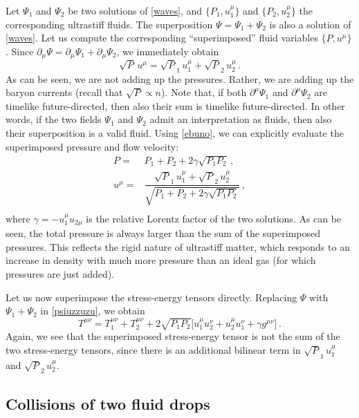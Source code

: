 \documentclass[a4paper, amsfonts, amssymb, amsmath, reprint, showkeys, nofootinbib, twoside,notitlepage,onecolumn]{revtex4-2}
\theoremstyle{definition}
\theoremstyle{theorem}
\theoremstyle{corollary}
\begin{document}
Let $\Psi_1$ and $\Psi_2$ be two solutions of \eqref{waves}, and $\{P_1,u^\mu_1 \}$ and $\{P_2,u^\mu_2 \}$ the corresponding ultrastiff fluids. The superposition $\Psi=\Psi_1+\Psi_2$ is also a solution of \eqref{waves}. Let us compute the corresponding ``superimposed'' fluid variables $\{P,u^\mu \}$. Since $\partial_\mu \Psi=\partial_\mu \Psi_1+\partial_\mu \Psi_2$, we immediately obtain
\begin{equation}\label{ebuno}
    \sqrt{P} \, u^\mu = \sqrt{P}_1 \, u_1^\mu +\sqrt{P}_2 \, u_2^\mu \, .
\end{equation}
As can be seen, we are not adding up the pressures. Rather, we are adding up the baryon currents (recall that $\sqrt{P}\propto n$). Note that, if both $\partial^\mu \Psi_1$ and $\partial^\mu \Psi_2$ are timelike future-directed, then also their sum is timelike future-directed. In other words, if the two fields $\Psi_1$ and $\Psi_2$ admit an interpretation as fluids, then also their superposition is a valid fluid. Using \eqref{ebuno}, we can explicitly evaluate the superimposed pressure and flow velocity:
\begin{equation}\label{orso}
\begin{split}
P ={}& P_1+P_2 +2\gamma \sqrt{P_1 P_2} \, , \\
u^\mu={}& \dfrac{\sqrt{P}_1 \, u_1^\mu +\sqrt{P}_2 \, u_2^\mu}{\sqrt{P_1+P_2 +2\gamma \sqrt{P_1 P_2}}} \, , \\
\end{split}
\end{equation}
where $\gamma=-u^\mu_1 u_{2\mu}$ is the relative Lorentz factor of the two solutions. As can be seen, the total pressure is always larger than the sum of the superimposed pressures. This reflects the rigid nature of ultrastiff matter, which responds to an increase in density with much more pressure than an ideal gas (for which pressures are just added).

Let us now superimpose the stress-energy tensors directly. Replacing $\Psi$ with $\Psi_1+\Psi_2$ in \eqref{psiuzzuzu}, we obtain
\begin{equation}
T^{\mu \nu}= T_1^{\mu \nu}+T_2^{\mu \nu}+2\sqrt{P_1 P_2} \big[ u_1^\mu u_2^\nu{+}u_2^\mu u_1^\nu {+}\gamma g^{\mu \nu}\big] \, .
\end{equation}
Again, we see that the superimposed stress-energy tensor is not the sum of the two stress-energy tensors, since there is an additional bilinear term in $\sqrt{P}_1 \, u_1^\mu$ and $\sqrt{P}_2 \, u_2^\mu$.

\subsection{Collisions of two fluid drops}
\end{document}

